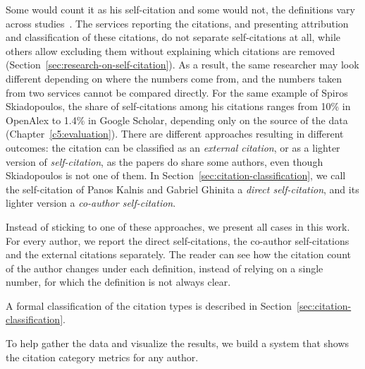 Some would count it as his self-citation and some would not, the definitions vary across studies~\cite{Glnzel2003BIBLIOMETRICSAA, Costas2010}.
The services reporting the citations, and presenting attribution and classification of these citations, do not separate self-citations at all, while others allow excluding them without explaining which citations are removed (Section~\ref{sec:research-on-self-citation}).
As a result, the same researcher may look different depending on where the numbers come from, and the numbers taken from two services cannot be compared directly.
For the same example of Spiros Skiadopoulos, the share of self-citations among his citations ranges from 10\% in \textsf{OpenAlex} to 1.4\% in \textsf{Google Scholar}, depending only on the source of the data (Chapter~\ref{c5:evaluation}).
There are different approaches resulting in different outcomes: the citation can be classified as an \emph{external citation}, or as a lighter version of \emph{self-citation}, as the papers do share some authors, even though Skiadopoulos is not one of them.
In Section~\ref{sec:citation-classification}, we call the self-citation of Panos Kalnis and Gabriel Ghinita a \emph{direct self-citation}, and its lighter version a \emph{co-author self-citation}.

Instead of sticking to one of these approaches, we present all cases in this work.
For every author, we report the direct self-citations, the co-author self-citations and the external citations separately.
The reader can see how the citation count of the author changes under each definition, instead of relying on a single number, for which the definition is not always clear.

A formal classification of the citation types is described in Section~\ref{sec:citation-classification}.


To help gather the data and visualize the results, we build a system that shows the citation category metrics for any author.



